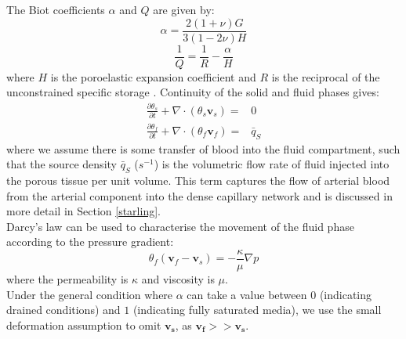 \documentclass[oneside,11pt,times]{book}
\begin{document}
The Biot coefficients $\alpha$ and $Q$ are given by: 
\begin{equation}
\alpha = \frac{2\left( 1 + \nu \right) G}{3\left( 1 - 2\nu \right) H}
\label{eqn:alpha}
\end{equation}
\begin{equation}
\frac{1}{Q} = \frac{1}{R} - \frac{\alpha}{H}
\label{eqn:c}
\end{equation}
where $H$ is the poroelastic expansion coefficient and $R$ is the reciprocal of the unconstrained specific storage \cite{biot,lecturenotes}. 
Continuity of the solid and fluid phases gives:
\begin{eqnarray}
    \frac{\partial \theta_s}{\partial t} + \nabla \cdot \left( \theta_s \bm{v}_s \right) =&0 \\
    \frac{\partial \theta_f}{\partial t} + \nabla \cdot \left( \theta_f \bm{v}_f \right) =& \bar{q}_S
    \label{continuity_f}
\end{eqnarray}
where we assume there is some transfer of blood into the fluid compartment, such that the source density $\bar{q}_S$ ($s^{-1}$) is the volumetric flow rate of fluid injected into the porous tissue per unit volume. This term captures the flow of arterial blood from the arterial component into the dense capillary network and is discussed in more detail in Section \ref{starling}.\\

Darcy's law can be used to characterise the movement of the fluid phase according to the pressure gradient:
\begin{equation}
    \theta_f \left( \bm{v}_f -\bm{v}_s\right) = - \frac{\kappa}{\mu} \nabla p
    \label{darcy}
\end{equation}
where the permeability is $\kappa$ and viscosity is $\mu$. \\

Under the general condition where $\alpha$ can take a value between $0$ (indicating drained conditions) and $1$ (indicating fully saturated media), we use the small deformation assumption to omit $\bm{v_s}$, as $\bm{v_f} >> \bm{v_s}$.\\
\end{document}
